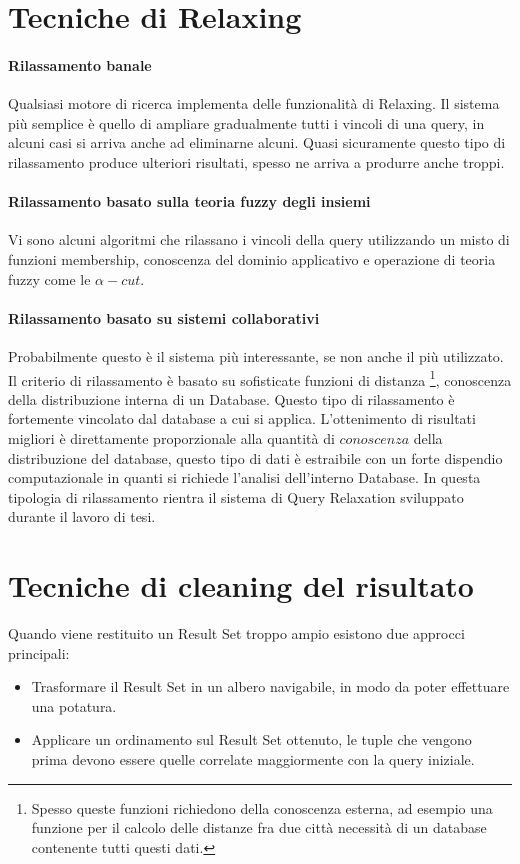 \section{Tecniche di Relaxing}
\paragraph{Rilassamento banale}
Qualsiasi motore di ricerca implementa delle funzionalità di Relaxing.
Il sistema più semplice è quello di ampliare gradualmente tutti i vincoli di una query, in alcuni casi si arriva anche ad eliminarne alcuni.
Quasi sicuramente questo tipo  di rilassamento produce ulteriori risultati, spesso ne arriva a produrre anche troppi.
\paragraph{Rilassamento basato sulla teoria fuzzy degli insiemi}
Vi sono alcuni algoritmi \cite{generalfuzzy} \cite{emptyvs} che rilassano i vincoli della query utilizzando un misto di funzioni membership, conoscenza del dominio applicativo e operazione di teoria fuzzy come le $\alpha-cut$.
\paragraph{Rilassamento basato su sistemi collaborativi}
Probabilmente questo è il sistema più interessante, se non anche il più utilizzato. Il criterio di rilassamento è basato su sofisticate funzioni di distanza \footnote{Spesso queste funzioni richiedono della conoscenza esterna, ad esempio una funzione per il calcolo delle distanze fra due città necessità di un database contenente tutti questi dati.}, conoscenza della distribuzione interna di un Database. 
Questo tipo di rilassamento è fortemente vincolato dal database a cui si applica. L'ottenimento di risultati migliori è direttamente proporzionale alla quantità di $conoscenza$ della distribuzione del database, questo tipo di dati è estraibile con un forte dispendio computazionale in quanti si richiede l'analisi dell'interno Database.  In questa tipologia di rilassamento rientra il sistema di Query Relaxation sviluppato durante il lavoro di tesi.

\section{Tecniche di cleaning del risultato}
Quando viene restituito un Result Set troppo ampio esistono due approcci principali:
\begin{itemize}
\item Trasformare il Result Set in un albero navigabile, in modo da poter effettuare una potatura.
\item Applicare un ordinamento sul Result Set ottenuto, le tuple che vengono prima devono essere quelle correlate maggiormente con la query iniziale.
\end{itemize}

